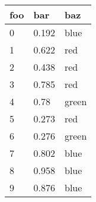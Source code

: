 \begin{tabular}{l l l}
foo & bar & baz \\
\hline
0 & 0.192 & blue \\
1 & 0.622 & red \\
2 & 0.438 & red \\
3 & 0.785 & red \\
4 & 0.78 & green \\
\hline
5 & 0.273 & red \\
6 & 0.276 & green \\
7 & 0.802 & blue \\
8 & 0.958 & blue \\
9 & 0.876 & blue \\
\end{tabular}
